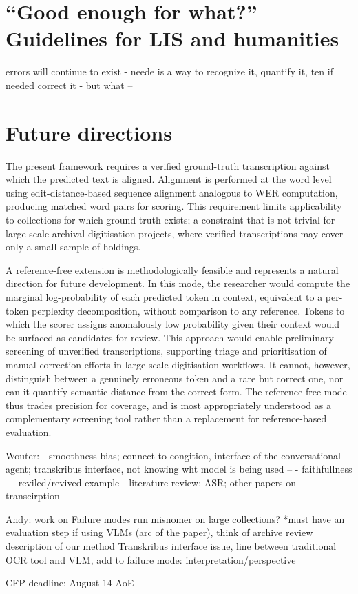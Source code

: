 \documentclass{anthology-ch}         %
\begin{document}
\section{``Good enough for what?'' Guidelines for LIS and humanities}

errors will continue to exist - neede is a way to recognize it, quantify it, ten if needed correct it - but what -- 


\section{Future directions}
The present framework requires a verified ground-truth transcription against which the predicted text is aligned. Alignment is performed at the word level using edit-distance-based sequence alignment analogous to WER computation, producing matched word pairs for scoring. This requirement limits applicability to collections for which ground truth exists; a constraint that is not trivial for large-scale archival digitisation projects, where verified transcriptions may cover only a small sample of holdings.

A reference-free extension is methodologically feasible and represents a natural direction for future development. In this mode, the researcher would compute the marginal log-probability of each predicted token in context, equivalent to a per-token perplexity decomposition, without comparison to any reference. Tokens to which the scorer assigns anomalously low probability given their context would be surfaced as candidates for review. This approach would enable preliminary screening of unverified transcriptions, supporting triage and prioritisation of manual correction efforts in large-scale digitisation workflows. It cannot, however, distinguish between a genuinely erroneous token and a rare but correct one, nor can it quantify semantic distance from the correct form. The reference-free mode thus trades precision for coverage, and is most appropriately understood as a complementary screening tool rather than a replacement for reference-based evaluation.


Wouter: 
- smoothness bias; connect to congition, interface of the conversational agent; transkribus interface, not knowing wht model is being used -- 
- faithfullness -
- reviled/revived example
- literature review: ASR; other papers on transcirption -- 

Andy:
work on Failure modes 
run misnomer on large collections? 
*must have an evaluation step if using VLMs (arc of the paper), think of archive
review description of our method
Transkribus interface issue, 
line between traditional OCR tool and VLM, 
add to failure mode: interpretation/perspective

CFP deadline: August 14 AoE

\printbibliography
\end{document}
